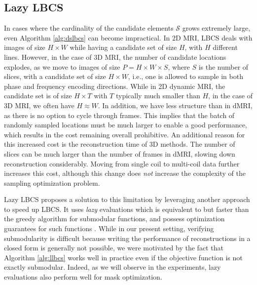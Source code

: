 \subsection{Lazy LBCS}\label{ss:llbcs}
In cases where the cardinality of the candidate elements $\mathcal{S}$ grows extremely large, even Algorithm \ref{alg:dslbcs} can become impractical. In 2D MRI, LBCS deals with images of size $H \times W$ while having a candidate set of size $H$, with $H$ different lines. However, in the case of 3D MRI, the number of candidate locations explodes, as we move to images of size $P= H \times W \times S$, where $S$ is the number of slices, with a candidate set of size $H \times W$, i.e., one is allowed to sample in both phase and frequency encoding directions. While in 2D dynamic MRI, the candidate set is of size $H \times T$ with $T$ typically much smaller than $H$, in the case of 3D MRI, we often have $H \approx W$. In addition, we have less structure than in dMRI, as there is no option to cycle through frames. This implies that the batch of randomly sampled locations must be much larger to enable a good performance, which results in the cost remaining overall prohibitive.
An additional reason for this increased cost is the reconstruction time of 3D methods. The number of slices can be much larger than the number of frames in dMRI, slowing down reconstruction considerably.
Moving from single coil to multi-coil data further increases this cost, although this change does \textit{not} increase the complexity of the sampling optimization problem. 


Lazy LBCS proposes a solution to this limitation by leveraging another approach to speed up LBCS. It uses \textit{lazy} evaluations \citep{minoux1978accelerated} which is equivalent to but faster than the greedy algorithm for submodular functions, and possess optimization guarantees for such functions \citep{nemhauser1978analysis}. While in our present setting, verifying submodularity is difficult because writing the performance of reconstructions in a closed form is generally not possible, we were motivated by the fact that Algorithm \ref{alg:llbcs} works well in practice even if the objective function is not exactly submodular. Indeed, as we will observe in the experiments, lazy evaluations also perform well for mask optimization. 

